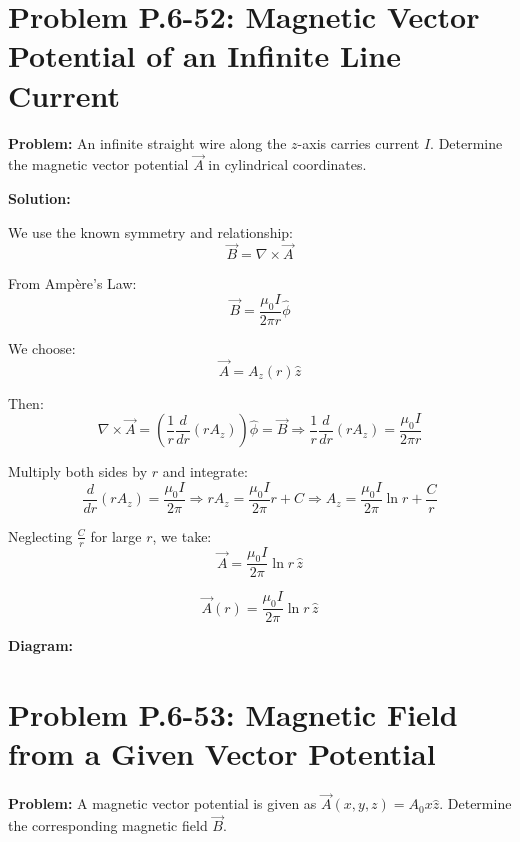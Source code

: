 \documentclass[12pt]{article}
\begin{document}
\section*{Problem P.6-52: Magnetic Vector Potential of an Infinite Line Current}

\textbf{Problem:}  
An infinite straight wire along the \( z \)-axis carries current \( I \). Determine the magnetic vector potential \( \vec{A} \) in cylindrical coordinates.

\textbf{Solution:}

We use the known symmetry and relationship:
\[
\vec{B} = \nabla \times \vec{A}
\]

From Ampère’s Law:
\[
\vec{B} = \frac{\mu_0 I}{2\pi r} \hat{\phi}
\]

We choose:
\[
\vec{A} = A_z(r) \hat{z}
\]

Then:
\[
\nabla \times \vec{A} = \left( \frac{1}{r} \frac{d}{dr}(r A_z) \right) \hat{\phi} = \vec{B}
\Rightarrow \frac{1}{r} \frac{d}{dr}(r A_z) = \frac{\mu_0 I}{2\pi r}
\]

Multiply both sides by \( r \) and integrate:
\[
\frac{d}{dr}(r A_z) = \frac{\mu_0 I}{2\pi} \Rightarrow r A_z = \frac{\mu_0 I}{2\pi} r + C
\Rightarrow A_z = \frac{\mu_0 I}{2\pi} \ln r + \frac{C}{r}
\]

Neglecting \( \frac{C}{r} \) for large \( r \), we take:
\[
\vec{A} = \frac{\mu_0 I}{2\pi} \ln r \, \hat{z}
\]

\begin{tcolorbox}
\[
\boxed{\vec{A}(r) = \frac{\mu_0 I}{2\pi} \ln r \, \hat{z}}
\]
\end{tcolorbox}

\textbf{Diagram:}
\begin{center}
\end{center}



\section*{Problem P.6-53: Magnetic Field from a Given Vector Potential}

\textbf{Problem:}  
A magnetic vector potential is given as \( \vec{A}(x, y, z) = A_0 x \hat{z} \). Determine the corresponding magnetic field \( \vec{B} \).
\end{document}
